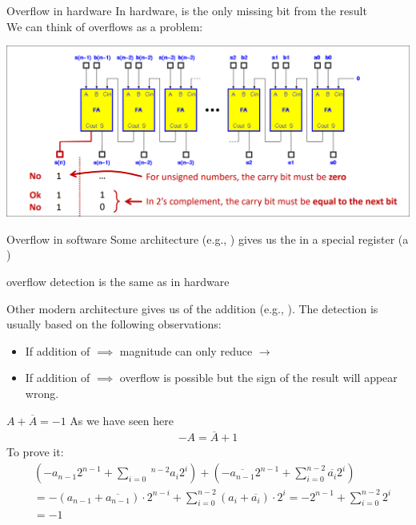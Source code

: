 \begin{parag}{Overflow in hardware}
    In hardware,  is the only missing bit from the  result\\
	We can think of overflows as a  problem:
	\begin{center}
	\includegraphics[scale=0.3]{screenshots/2025-10-21_2.png}
	\end{center}
\end{parag}
\begin{parag}{Overflow in software}
    Some architecture (e.g., ) gives us the  in a special register (a )
	\begin{center}
	    \textrightarrow overflow detection is the same as in hardware
	\end{center}
	Other modern architecture gives us  of the addition (e.g., ). The detection is usually based on the following observations:
	\begin{itemize}
	    \item If addition of  $\implies$ magnitude can only reduce $\to$
	    \item If addition of $\implies$ overflow is possible but the sign of the result will appear wrong.
	\end{itemize}
	
	
	\end{parag}
\begin{parag}{$A + \overline{A} = -1$}
	As we have seen here
	\begin{align*} -A = \overline{A} + 1\end{align*}
	To prove it:
	\begin{align*} &\left(-a_{n-1} 2^{n-1} + \sum_{i =  0}\
		^{n-2}a_i2^i\right) + \left(-\overline{a_{n-1}}2^{n-1} + \sum_{i = 0}^{n-2}\overline{a_i}2^i\right) \\ &= - \left(a_{n-1} + \overline{a_{n-1}}\right) \cdot 2^{n-i} + \sum_{i = 0}^{n-2}\left(a_i + \overline{a_i}\right) \cdot 2^i =  -2^{n-1} + \sum_{i = 0}^{n-2}  2^i\\ &=  -1
\end{align*}
    
\end{parag}
